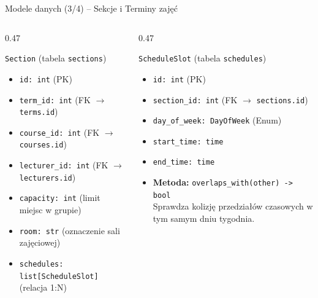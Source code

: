 \documentclass[aspectratio=169, 10pt, xcolor=table]{beamer}
\begin{document}
\begin{frame}{Modele danych (3/4) -- Sekcje i Terminy zajęć}
    \footnotesize
    \begin{columns}[T, onlytextwidth]
        \begin{column}{0.47\textwidth}
            \begin{block}{\texttt{Section} (tabela \texttt{sections})}
                \begin{itemize}
                    \item \texttt{id: int} (PK)
                    \item \texttt{term\_id: int} (FK $\rightarrow$ \texttt{terms.id})
                    \item \texttt{course\_id: int} (FK $\rightarrow$ \texttt{courses.id})
                    \item \texttt{lecturer\_id: int} (FK $\rightarrow$ \texttt{lecturers.id})
                    \item \texttt{capacity: int} (limit miejsc w grupie)
                    \item \texttt{room: str} (oznaczenie sali zajęciowej)
                    \item \texttt{schedules: list[ScheduleSlot]} (relacja 1:N)
                \end{itemize}
            \end{block}
        \end{column}
        \begin{column}{0.47\textwidth}
            \begin{exampleblock}{\texttt{ScheduleSlot} (tabela \texttt{schedules})}
                \begin{itemize}
                    \item \texttt{id: int} (PK)
                    \item \texttt{section\_id: int} (FK $\rightarrow$ \texttt{sections.id})
                    \item \texttt{day\_of\_week: DayOfWeek} (Enum)
                    \item \texttt{start\_time: time}
                    \item \texttt{end\_time: time}
                    \item \textbf{Metoda:} \texttt{overlaps\_with(other) -> bool}\\
                    {\scriptsize Sprawdza kolizję przedziałów czasowych w tym samym dniu tygodnia.}
                \end{itemize}
            \end{exampleblock}
        \end{column}
    \end{columns}
\end{frame}
\end{document}

